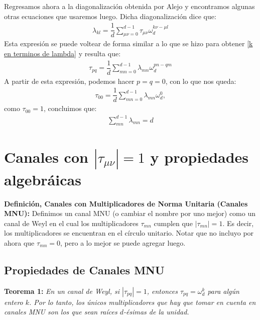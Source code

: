 Regresamos ahora a la diagonalización obtenida por Alejo  y encontramos algunas otras ecuaciones que usaremos luego. Dicha diagonalización dice que:
\begin{align*}
\lambda_{kl} = \dfrac{1}{d} \sum_{\mu \nu = 0}^{d-1} \tau_{\mu \nu} \omega_d^{k \nu - \mu l}
\end{align*}
Esta expresión se puede voltear de forma similar a lo que se hizo para obtener \ref{k en terminos de lambda} y resulta que:
\begin{align}
\label{tau en termino de lambda}
\tau_{pq} = \dfrac{1}{d} \sum_{mn=0}^{d-1} \lambda_{mn} \omega_d^{pn-qm}
\end{align}
A partir de esta expresión, podemos hacer $p=q=0$, con lo que nos queda:
\begin{align*}
\tau_{00} = \dfrac{1}{d} \sum_{mn=0}^{d-1} \lambda_{mn} \omega_d^0,
\end{align*}
como $\tau_{00}=1$, concluimos que:
\begin{align}
\label{suma-lambdas}
\sum_{mn}^{d-1}\lambda_{mn} = d
\end{align}

\section{Canales con $|\tau_{\mu\nu}|=1$ y propiedades algebráicas} %

\textbf{Definición, Canales con Multiplicadores de Norma Unitaria (Canales MNU):} Definimos un canal MNU
(o cambiar el nombre por uno mejor) como un canal de Weyl en el cual los
multiplicadores $\tau_{mn}$ cumplen que $|\tau_{mn}|= 1$.  Es decir, los
multiplicadores se encuentran en el círculo unitario. Notar que no incluyo por
ahora que $\tau_{mn} = 0$, pero a lo mejor se puede agregar luego. 





\subsection{Propiedades de Canales MNU}

\textbf{Teorema 1:} \textit{En un canal de Weyl, si $|\tau_{pq}| = 1$, entonces $\tau_{pq} = \omega_d^{k}$ para algún entero $k$. Por lo tanto, los únicos multiplicadores que hay que tomar en cuenta en canales MNU son los que sean raíces $d$-ésimas de la unidad.} \\

